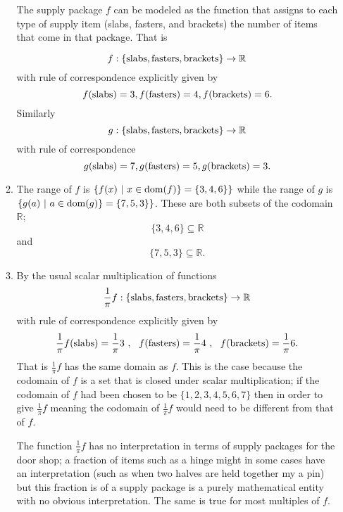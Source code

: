 \documentclass[12pt]{article}
\def\R{{\mathbb{R}}}
\begin{document}
\begin{enumerate}
\begin{enumerate}
The supply package $f$ can be modeled as the function that assigns to 
each type of supply item (slabs, fasters, and brackets) the number of items that come in that package. That is 


\[ f: \{ {\rm slabs, fasters,brackets} \} \to \R \]
with rule of correspondence explicitly given by
\[  f({\rm slabs})=3,f({\rm fasters})=4, f({\rm brackets})= 6.\]
Similarly
\[ g: \{ {\rm slabs, fasters,brackets} \} \to  \R \]
with rule of correspondence
\[  g({\rm slabs})=7,g({\rm fasters})=5, g({\rm brackets})= 3. \]

\item The range of $f$ is $\{ f(x)~|~x\in{\rm dom}(f)\}= \{3,4,6\} \}$
while the range of $g$ is $\{ g(a)~|~a\in {\rm dom}(g)\}= \{7,5,3\}\} $. These are both subsets of the codomain $\R$; 
\[ \{3,4,6\} \subseteq  \R\]
and
\[ \{7,5,3\} \subseteq  \R.\]

\item By the usual scalar multiplication of functions 
\[ \frac1\pi f: \{ {\rm slabs, fasters,brackets} \} \to \R \]
with rule of correspondence explicitly given by
\[  \frac1\pi f({\rm slabs})=\frac1\pi 3~,~~f({\rm fasters})=\frac1\pi 4~,~~ f({\rm brackets})= \frac1\pi 6.\] That is 
$\frac1\pi f$ has the same domain as $f$. This is the case because the codomain of $f$ is a set that is closed under scalar multiplication; if the codomain of $f$ had been chosen to be $\{1,2,3,4,5,6,7\}$ then in order to give $\frac1\pi f$ meaning the codomain of $\frac1\pi f$ would need to be different from that of $f$. 

The function $\frac1\pi f$ has no interpretation in terms of supply packages for the door shop; a fraction of items such as a hinge might in some cases have an interpretation (such as when two halves are held together my a pin) but this fraction is of a supply package is a purely mathematical entity with no obvious interpretation. The same is true for most multiples of $f$.



\end{enumerate}
\end{enumerate}
\end{document}
